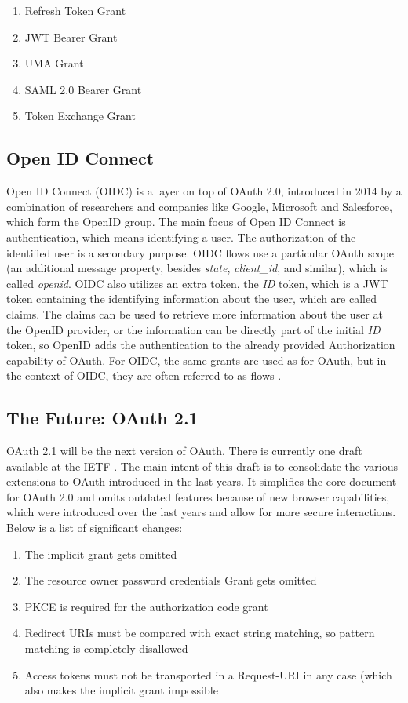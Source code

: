 \begin{enumerate}
	\item Refresh Token Grant
	\item JWT Bearer Grant
	\item UMA Grant
	\item SAML 2.0 Bearer Grant
	\item Token Exchange Grant
\end{enumerate}

\subsection{Open ID Connect}
Open ID Connect (OIDC) is a layer on top of OAuth 2.0, introduced in 2014 by a combination of researchers and companies like Google, Microsoft and Salesforce, which form the OpenID group. The main focus of Open ID Connect is authentication, which means identifying a user. The authorization of the identified user is a secondary purpose. OIDC flows use a particular OAuth scope (an additional message property, besides \emph{state}, \emph{client\_id}, and similar), which is called \emph{openid}. OIDC also utilizes an extra token, the \emph{ID} token, which is a JWT token containing the identifying information about the user, which are called claims. The claims can be used to retrieve more information about the user at the OpenID provider, or the information can be directly part of the initial \emph{ID} token, so OpenID adds the authentication to the already provided Authorization capability of OAuth. For OIDC, the same grants are used as for OAuth, but in the context of OIDC, they are often referred to as flows \cite{li2016analysing} \cite{sakimura2014openid}.

\subsection{The Future: OAuth 2.1}
OAuth 2.1 will be the next version of OAuth. There is currently one draft available at the IETF \cite{hardt2023rfc}. The main intent of this draft is to consolidate the various extensions to OAuth introduced in the last years. It simplifies the core document for OAuth 2.0 and omits outdated features because of new browser capabilities, which were introduced over the last years and allow for more secure interactions. Below is a list of significant changes:
\begin{enumerate}
	\item The implicit grant gets omitted
	\item The resource owner password credentials Grant gets omitted
	\item PKCE is required for the authorization code grant
	\item Redirect URIs must be compared with exact string matching, so pattern matching is completely disallowed
	\item Access tokens must not be transported in a Request-URI in any case (which also makes the implicit grant impossible
\end{enumerate}

